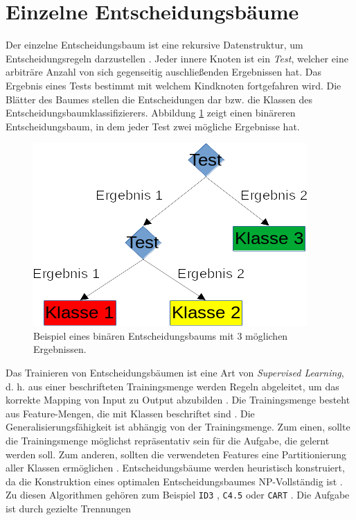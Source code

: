 \section{Einzelne Entscheidungsbäume}
\label{sec:dt_ind_decision_trees}
Der einzelne Entscheidungsbaum ist eine rekursive Datenstruktur, um Entscheidungsregeln darzustellen \cite{quinlan1990decision}.
Jeder innere Knoten ist ein \textit{Test}, welcher eine arbiträre Anzahl von sich gegenseitig auschließenden Ergebnissen hat.
Das Ergebnis eines Tests bestimmt mit welchem Kindknoten fortgefahren wird.
Die Blätter des Baumes stellen die Entscheidungen dar bzw. die Klassen des Entscheidungsbaumklassifizierers.
Abbildung \ref{fig:entscheidungsbaum} zeigt einen binäreren Entscheidungsbaum, in dem jeder Test zwei mögliche Ergebnisse hat.
\begin{figure}[h!]
    \centering
    \includegraphics[width=0.5\linewidth]{images/entscheidungsbaum.png}
    \caption{Beispiel eines binären Entscheidungsbaums mit 3 möglichen Ergebnissen.}
    \label{fig:entscheidungsbaum}
\end{figure}
Das Trainieren von Entscheidungsbäumen ist eine Art von \textit{Supervised Learning}, d. h. aus einer beschrifteten Trainingsmenge werden Regeln abgeleitet, um das korrekte Mapping von Input
zu Output abzubilden \cite{goshKMeans}. Die Trainingsmenge besteht aus Feature-Mengen, die mit Klassen beschriftet sind \cite{steinbergCART}. Die Generalisierungsfähigkeit ist abhängig von der
Trainingsmenge. Zum einen, sollte die Trainingsmenge möglichst repräsentativ sein für die Aufgabe, die gelernt werden soll. Zum anderen, sollten die verwendeten Features eine Partitionierung
aller Klassen ermöglichen \cite{pei1998feature}.
\newline
\newline
Entscheidungsbäume werden heuristisch konstruiert, da die Konstruktion eines optimalen Entscheidungsbaumes NP-Vollständig ist \cite{laurent1976constructing}. Zu diesen Algorithmen gehören
zum Beispiel \texttt{ID3} \cite{quinlan1986induction}, \texttt{C4.5} \cite{quinlan2014c4} oder \texttt{CART} \cite{breiman1984classification}. Die Aufgabe ist durch gezielte Trennungen
